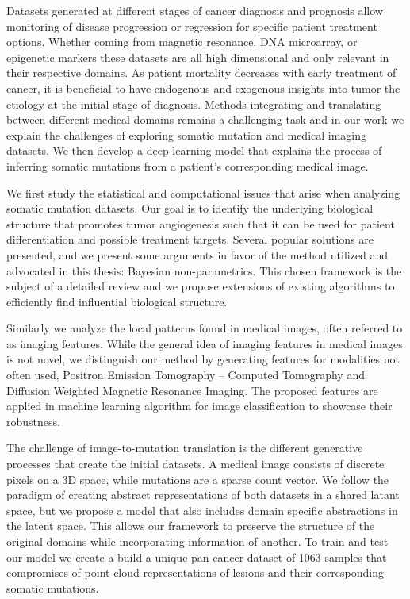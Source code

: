 Datasets generated at different stages of cancer diagnosis and prognosis allow monitoring of 
disease progression or regression for specific patient treatment options.  Whether coming from magnetic resonance, 
DNA microarray, or epigenetic markers these datasets are all high dimensional and only relevant in their respective domains.  
As patient mortality decreases with early treatment of cancer, it is beneficial to have endogenous and exogenous insights into tumor the etiology at the initial stage of diagnosis.  Methods integrating and translating between different medical domains remains a challenging task and in our work we explain the challenges of exploring somatic mutation and medical imaging datasets.  We then develop a deep learning model that explains the process of inferring somatic mutations from a patient's corresponding medical image.

We first study the statistical and computational issues that arise when analyzing somatic mutation datasets.  Our goal is to identify the underlying biological structure that promotes tumor angiogenesis such that it can be used for patient differentiation and possible treatment targets.  Several popular solutions are presented, and we present some arguments in favor of
the method utilized and advocated in this thesis: Bayesian non-parametrics. This chosen
framework is the subject of a detailed review and we propose extensions of existing algorithms to efficiently find influential biological structure.

Similarly we analyze the local patterns found in medical images, often referred to as imaging features.  While the general idea of imaging features in medical images is not novel, we distinguish our method by generating features for modalities not often used, Positron Emission Tomography – Computed Tomography  and Diffusion Weighted Magnetic Resonance Imaging.   The proposed features are applied in machine learning algorithm for image classification to showcase their robustness.

The challenge of image-to-mutation translation is the different generative processes that create the initial datasets.  A medical image consists of discrete pixels on a 3D space, while mutations are a sparse count vector.  We follow the paradigm of creating abstract representations of both datasets in a shared latant space, but we propose a model that also includes domain specific abstractions in the latent space.  This allows our framework to preserve the structure of the original domains while incorporating information of another.  To train and test our model we create a build a unique pan cancer dataset of 1063 samples that compromises of point cloud representations of lesions and their corresponding somatic mutations.  

